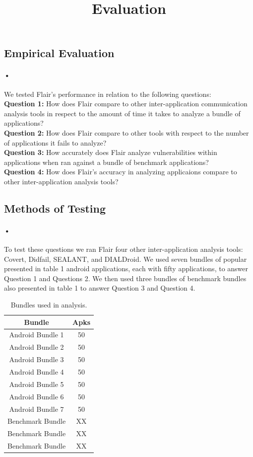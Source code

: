 \documentclass[twocolumn]{article}
\title{Evaluation}
\begin{document}
\begin{center}
\section[1]{Empirical Evaluation}
\end{center}


\paragraph{•}
	We tested Flair's performance in relation to the following questions:\\
	\textbf{Question 1:} How does Flair compare to other inter-application communication analysis tools in respect to the amount of time it takes to analyze a bundle of applications?\\
	\textbf{Question 2:} How does Flair compare to other tools with respect to the number of applications it fails to analyze?\\
	\textbf{Question 3:} How accurately does Flair analyze vulnerabilities within applications when ran against a bundle of benchmark applications?\\
	\textbf{Question 4:} How does Flair's accuracy in analyzing applicaions compare to other inter-application analysis tools?\\

\subsection{Methods of Testing}
\paragraph{•}
	To test these questions we ran Flair four other inter-application analysis tools: Covert, Didfail, SEALANT, and DIALDroid. We used seven bundles of popular presented in table 1 android applications, each with fifty applications, to answer Question 1 and Questions 2. We then used three bundles of benchmark bundles also presented in table 1 to answer Question 3 and Question 4. 


\begin{table}[h]
\begin{center}
\begin{tabular}{ |c c| }
	\hline
	Bundle & Apks\\
	\hline
	Android Bundle 1 & 50\\
	Android Bundle 2 & 50\\
	Android Bundle 3 & 50\\
	Android Bundle 4 & 50\\
	Android Bundle 5 & 50\\
	Android Bundle 6 & 50\\
	Android Bundle 7 & 50\\
	Benchmark Bundle & XX\\
	Benchmark Bundle & XX\\
	Benchmark Bundle & XX\\
	\hline
\end{tabular}
\end{center}
\caption{Bundles used in analysis.}
\label{table:1}
\end{table}
\end{document}
